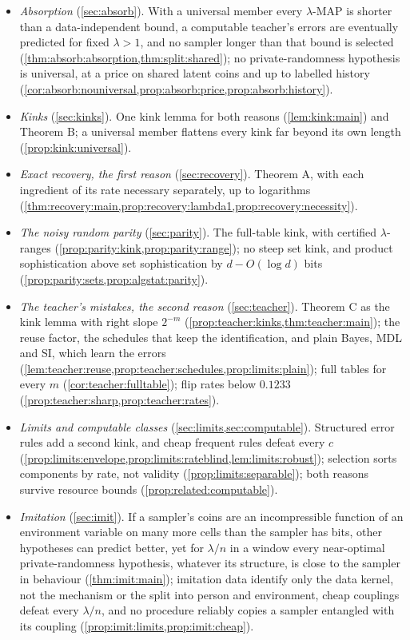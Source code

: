 \begin{itemize}[leftmargin=1.5em,itemsep=0pt,topsep=2pt]
\item \emph{Absorption} (\cref{sec:absorb}). With a universal member every $\lambda$-MAP is shorter than a data-independent bound, a computable teacher's errors are eventually predicted for fixed $\lambda>1$, and no sampler longer than that bound is selected (\cref{thm:absorb:absorption,thm:split:shared}); no private-randomness hypothesis is universal, at a price on shared latent coins and up to labelled history (\cref{cor:absorb:nouniversal,prop:absorb:price,prop:absorb:history}).
\item \emph{Kinks} (\cref{sec:kinks}). One kink lemma for both reasons (\cref{lem:kink:main}) and Theorem B; a universal member flattens every kink far beyond its own length (\cref{prop:kink:universal}).
\item \emph{Exact recovery, the first reason} (\cref{sec:recovery}). Theorem A, with each ingredient of its rate necessary separately, up to logarithms (\cref{thm:recovery:main,prop:recovery:lambda1,prop:recovery:necessity}).
\item \emph{The noisy random parity} (\cref{sec:parity}). The full-table kink, with certified $\lambda$-ranges (\cref{prop:parity:kink,prop:parity:range}); no steep set kink, and product sophistication above set sophistication by $d-O(\log d)$ bits (\cref{prop:parity:sets,prop:algstat:parity}).
\item \emph{The teacher's mistakes, the second reason} (\cref{sec:teacher}). Theorem C as the kink lemma with right slope $2^{-m}$ (\cref{prop:teacher:kinks,thm:teacher:main}); the reuse factor, the schedules that keep the identification, and plain Bayes, MDL and SI, which learn the errors (\cref{lem:teacher:reuse,prop:teacher:schedules,prop:limits:plain}); full tables for every $m$ (\cref{cor:teacher:fulltable}); flip rates below $0.1233$ (\cref{prop:teacher:sharp,prop:teacher:rates}).
\item \emph{Limits and computable classes} (\cref{sec:limits,sec:computable}). Structured error rules add a second kink, and cheap frequent rules defeat every $c$ (\cref{prop:limits:envelope,prop:limits:rateblind,lem:limits:robust}); selection sorts components by rate, not validity (\cref{prop:limits:separable}); both reasons survive resource bounds (\cref{prop:related:computable}).
\item \emph{Imitation} (\cref{sec:imit}). If a sampler's coins are an incompressible function of an environment variable on many more cells than the sampler has bits, other hypotheses can predict better, yet for $\lambda/n$ in a window every near-optimal private-randomness hypothesis, whatever its structure, is close to the sampler in behaviour (\cref{thm:imit:main}); imitation data identify only the data kernel, not the mechanism or the split into person and environment, cheap couplings defeat every $\lambda/n$, and no procedure reliably copies a sampler entangled with its coupling (\cref{prop:imit:limits,prop:imit:cheap}).
\end{itemize}

